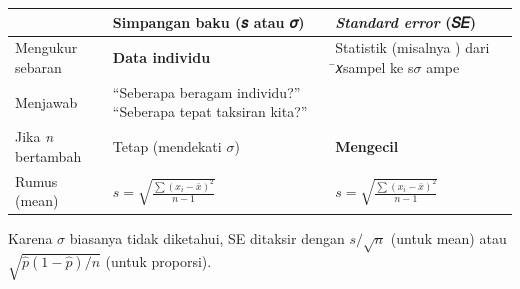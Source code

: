 \documentclass[
  indonesian,
  letterpaper,
]{book}
\newcounter{none} %
\begin{document}
{\def\LTcaptype{none} %
\begin{longtable}[]{@{}
  >{\raggedright\arraybackslash}p{}
  >{\raggedright\arraybackslash}p{}
  >{\raggedright\arraybackslash}p{}@{}}
\toprule\noalign{}
\begin{minipage}[b]{\linewidth}\raggedright
\end{minipage} & \begin{minipage}[b]{\linewidth}\raggedright
Simpangan baku (𝑠 atau 𝜎)
\end{minipage} & \begin{minipage}[b]{\linewidth}\raggedright
\emph{Standard error} (𝑆𝐸)
\end{minipage} \\
\midrule\noalign{}
\endhead
\bottomrule\noalign{}
\endlastfoot
Mengukur sebaran & \textbf{Data individu} & Statistik (misalnya ) dari
̄𝑥sampel ke s\(\sigma\) ampe \\
Menjawab & ``Seberapa beragam individu?'' ``Seberapa tepat taksiran
kita?'' & \\
Jika \emph{n} bertambah & Tetap (mendekati \(\sigma\)) &
\textbf{Mengecil} \\
Rumus (mean) & \(s = \sqrt{\frac{\sum (x_i - \bar{x})^2}{n - 1}}\) &
\(s = \sqrt{\frac{\sum (x_i - \bar{x})^2}{n - 1}}\) \\
\end{longtable}
}

Karena \(\sigma\) biasanya tidak diketahui, SE ditaksir dengan
\(s/\sqrt{n}\) (untuk mean) atau \(\sqrt{\hat{p}(1-\hat{p})/n}\) (untuk
proporsi).
\end{document}
